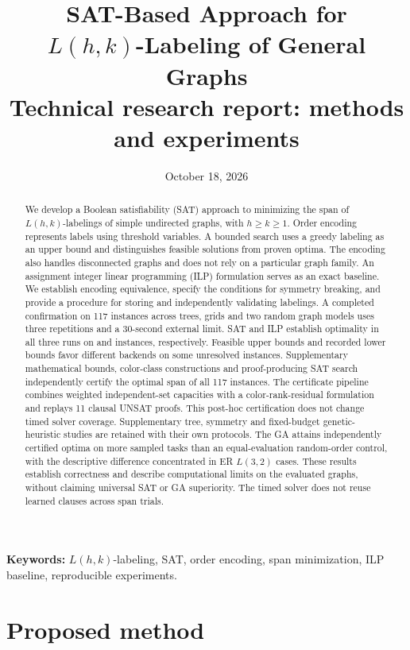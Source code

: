 \documentclass[11pt,a4paper]{article}
\title{SAT-Based Approach for\\$L(h,k)$-Labeling of General Graphs\\[0.5em]
{\large Technical research report: methods and experiments}}
\author{}
\date{October 18, 2026}
\begin{document}
\maketitle
\begin{abstract}
We develop a Boolean satisfiability (SAT) approach to minimizing the span of
$L(h,k)$-labelings of simple undirected graphs, with $h\geq k\geq1$.
Order encoding represents labels using threshold variables. A bounded
search uses a greedy labeling as an upper bound and distinguishes feasible
solutions from proven optima. The encoding also handles disconnected graphs
and does not rely on a particular graph family. An assignment integer linear
programming (ILP) formulation serves as an exact baseline. We establish
encoding equivalence, specify the conditions for symmetry breaking, and
provide a procedure for storing and independently validating labelings.
A completed confirmation on 117 instances across trees, grids and two random
graph models uses three repetitions and a 30-second external limit.
SAT and ILP establish optimality in all three runs on
\ProgressSATStable{} and \ProgressILPStable{} instances, respectively.
Feasible upper bounds and recorded lower bounds favor different backends
on some unresolved instances. Supplementary mathematical bounds,
color-class constructions and proof-producing SAT search independently
certify the optimal span of all 117 instances. The certificate pipeline
combines weighted independent-set capacities with a color-rank-residual
formulation and replays 11 clausal UNSAT proofs. This post-hoc
certification does not change timed solver coverage.
Supplementary tree, symmetry and fixed-budget genetic-heuristic studies are
retained with their own protocols. The GA attains independently certified
optima on more sampled tasks than an equal-evaluation random-order control,
with the descriptive difference concentrated in ER $L(3,2)$ cases. These
results establish correctness and describe computational limits on the
evaluated graphs, without claiming universal SAT or GA superiority.
The timed solver does not reuse learned clauses across span trials.
\end{abstract}
\noindent\textbf{Keywords:} $L(h,k)$-labeling, SAT, order encoding,
span minimization, ILP baseline, reproducible experiments.


\section{Proposed method}















\clearpage
\appendix



\clearpage



\end{document}
